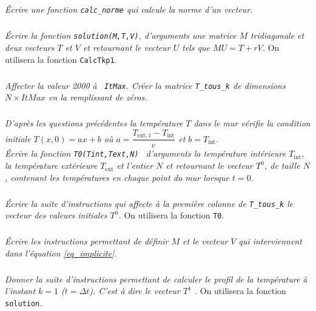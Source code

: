 \subparagraph{}
\textit{Écrire une fonction \texttt{calc\_norme} qui calcule la norme d'un vecteur. }


\subparagraph{\label{q_solve}}
\textit{Écrire la fonction \texttt{solution(M,T,V)}, d'arguments une matrice $M$
 tridiagonale et deux vecteurs $T$ et $V$ et retournant le vecteur $U$ tels que $MU=T+rV$.}
 On utilisera la fonction \texttt{CalcTkp1}.


\subparagraph{}
\textit{Affecter la valeur 2000 à  \texttt{ ItMax}. Créer la matrice  \texttt{T\_tous\_k}  de dimensions $N\times 
ItMax$ en la remplissant de zéros.}

\subparagraph{}
\textit{D'après les questions précédentes la température $T$ dans le mur vérifie la condition
 initiale  $T(x,0)=ax+b$ où 
 $a=\dfrac{T_{\text{ext},1}-T_{\text{int}}}{e}$  et  $b=T_{\text{int}}$.\\
Écrire la fonction \texttt{T0(Tint,Text,N) } d'arguments la température intérieure $T_{\text{int}}$, 
la température extérieure $T_{\text{ext}}$ et l'entier $N$ et retournant le vecteur $T^0$, de taille $N$,
contenant les températures en chaque point du mur lorsque $t=0$. }


\subparagraph{}
\textit{Écrire la suite d'instructions qui affecte à la première colonne de \texttt{T\_tous\_k} 
 le vecteur des valeurs initiales $T^0$. }
 On utilisera la fonction \texttt{T0}. 

\subparagraph{}
\textit{Écrire les instructions permettant de définir $M$ et le vecteur $V$ qui interviennent dans l'équation 
\ref{eq_implicite}. }


\subparagraph{}
\textit{Donner la suite d'instructions permettant de calculer le profil de la température à 
l'instant $k=1$ ($t=\Delta t$). C'est à dire le vecteur $T^1$ .}
On utilisera la fonction  \texttt{solution}.%

